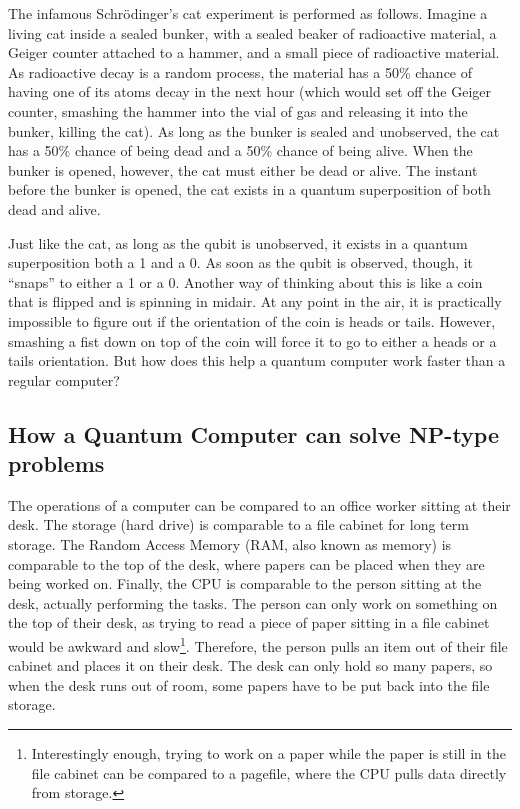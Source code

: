 \documentclass[10pt,journal,compsoc]{IEEEtran}
\begin{document}
The infamous Schr\"{o}dinger's cat experiment is performed as follows. Imagine a living cat inside a sealed bunker, with a sealed beaker of radioactive material, a Geiger counter attached to a hammer, and a small piece of radioactive material. As radioactive decay is a random process, the material has a 50\% chance of having one of its atoms decay in the next hour (which would set off the Geiger counter, smashing the hammer into the vial of gas and releasing it into the bunker, killing the cat). As long as the bunker is sealed and unobserved, the cat has a 50\% chance of being dead and a 50\% chance of being alive. When the bunker is opened, however, the cat must either be dead or alive. The instant before the bunker is opened, the cat exists in a quantum superposition of both dead and alive\cite{NatGeo}. 

Just like the cat, as long as the qubit is unobserved, it exists in a quantum superposition both a 1 and a 0. As soon as the qubit is observed, though, it ``snaps'' to either a 1 or a 0. Another way of thinking about this is like a coin that is flipped and is  spinning in midair. At any point in the air, it is practically impossible to figure out if the orientation of the coin is heads or tails. However, smashing a fist down on top of the coin will force it to go to either a heads or a tails orientation. But how does this help a quantum computer work faster than a regular computer?



\subsection{How a Quantum Computer can solve NP-type problems}

The operations of a computer can be compared to an office worker sitting at their desk. The storage (hard drive) is comparable to a file cabinet for long term storage. The Random Access Memory (RAM, also known as memory) is comparable to the top of the desk, where papers can be placed when they are being worked on. Finally, the CPU is comparable to the person sitting at the desk, actually performing the tasks. The person can only work on something on the top of their desk, as trying to read a piece of paper sitting in a file cabinet would be awkward and slow\footnote{Interestingly enough, trying to work on a paper while the paper is still in the file cabinet can be compared to a pagefile, where the CPU pulls data directly from storage.}. Therefore, the person pulls an item out of their file cabinet and places it on their desk. The desk can only hold so many papers, so when the desk runs out of room, some papers have to be put back into the file storage. 
\end{document}

